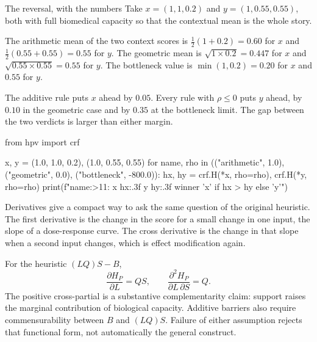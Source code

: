 \begin{workedexample}{The reversal, with the numbers}
Take $x=(1,1,0.2)$ and $y=(1,0.55,0.55)$, both with full biomedical capacity so
that the contextual mean is the whole story.

The arithmetic mean of the two context scores is $\tfrac12(1+0.2)=0.60$ for $x$
and $\tfrac12(0.55+0.55)=0.55$ for $y$. The geometric mean is
$\sqrt{1\times0.2}=0.447$ for $x$ and $\sqrt{0.55\times0.55}=0.55$ for $y$. The
bottleneck value is $\min(1,0.2)=0.20$ for $x$ and $0.55$ for $y$.

The additive rule puts $x$ ahead by $0.05$. Every rule with $\rho\le0$ puts $y$
ahead, by $0.10$ in the geometric case and by $0.35$ at the bottleneck limit.
The gap between the two verdicts is larger than either margin.

\begin{wecode}[Python]
from hpv import crf

x, y = (1.0, 1.0, 0.2), (1.0, 0.55, 0.55)
for name, rho in (("arithmetic", 1.0), ("geometric", 0.0), ("bottleneck", -800.0)):
    hx, hy = crf.H(*x, rho=rho), crf.H(*y, rho=rho)
    print(f"{name:>11}: x {hx:.3f}  y {hy:.3f}  winner {'x' if hx > hy else 'y'}")
\end{wecode}

\end{workedexample}

Derivatives give a compact way to ask the same question of the original heuristic. The first derivative is the change in the score for a small change in one input, the slope of a dose-response curve. The cross derivative is the change in that slope when a second input changes, which is effect modification again.

For the heuristic $(LQ)S-B$,
\begin{equation}
\frac{\partial H_P}{\partial L}=QS,
\qquad
\frac{\partial^2 H_P}{\partial L\,\partial S}=Q.
\label{eq:heuristic_derivatives}
\end{equation}
The positive cross-partial is a substantive complementarity claim: support
raises the marginal contribution of biological capacity. Additive barriers also
require commensurability between $B$ and $(LQ)S$. Failure of either assumption
rejects that functional form, not automatically the general construct.

